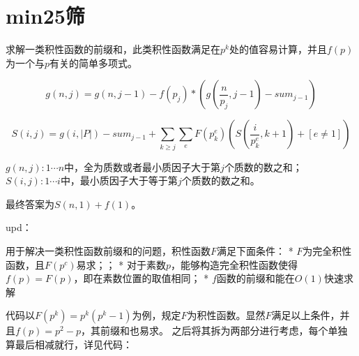 \documentclass[a4paper,11pt,twoside,fontset = fandol,UTF8]{ctexbook} %
\begin{document}
	\section{min25筛}
	求解一类积性函数的前缀和，此类积性函数满足在$p^k$处的值容易计算，并且$f(p)$为一个与$p$有关的简单多项式。
	
	$$g(n,j)=g(n,j-1)-f(p_j)*(g(\frac{n}{p_j},j-1)-sum_{j-1})$$
	
	$$S(i,j)=g(i,|P|)-sum_{j-1}+\sum_{k\geq j}\sum_{e}F(p_k^e)(S(\frac{i}{p_k^e},k+1)+[e\not ={1}])$$
	
	$g(n,j):1\cdots n$中，全为质数或者最小质因子大于第$j$个质数的数之和；$S(i,j):1\cdots i$中，最小质因子大于等于第$j$个质数的数之和。
	
	最终答案为$S(n,1)+f(1)$。
	
	
	upd：
	
	用于解决一类积性函数前缀和的问题，积性函数$F$满足下面条件：
	* $F$为完全积性函数，且$F(p^c)$易求；；
	* 对于素数$p$，能够构造完全积性函数使得$f(p)=F(p)$，即在素数位置的取值相同；
	* $f$函数的前缀和能在$O(1)$快速求解
	
	代码以$F(p^k)=p^k(p^k-1)$为例，规定$F$为积性函数。显然$F$满足以上条件，并且$f(p)=p^2-p$，其前缀和也易求。
	之后将其拆为两部分进行考虑，每个单独算最后相减就行，详见代码：
	
\end{document}
